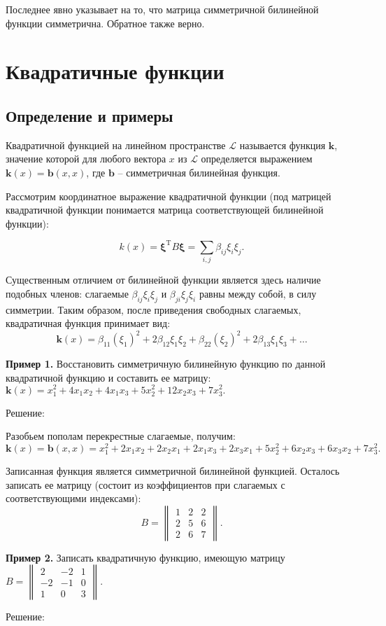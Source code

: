 Последнее явно указывает на то, что матрица симметричной билинейной функции симметрична. Обратное также верно.\\

\section{Квадратичные функции}
\subsection{Определение и примеры}
Квадратичной функцией на линейном пространстве $\mathcal{L}$ называется функция $\mathbf{k}$, значение которой для любого вектора $x$ из $\mathcal{L}$ определяется выражением $\mathbf{k}(x)=\mathbf{b}(x,x)$, где $\mathbf{b}$ -- симметричная билинейная функция.

Рассмотрим координатное выражение квадратичной функции (под матрицей квадратичной функции понимается матрица соответствующей билинейной функции):

$$k(x)=\bm{\xi}^{\text{T}}B\bm{\xi}=\sum_{i,j}\beta_{ij}\xi_i\xi_j.$$

Существенным отличием от билинейной функции является здесь наличие подобных членов: слагаемые $\beta_{ij}\xi_i\xi_j$ и $\beta_{ji}\xi_j\xi_i$ равны между собой, в силу симметрии. Таким образом, после приведения свободных слагаемых, квадратичная  функция принимает вид:$$\textbf{k}(x)=\beta_{11}(\xi_1)^2+2\beta_{12}\xi_1\xi_2+\beta_{22}(\xi_2)^2+2\beta_{13}\xi_1\xi_3+\ldots$$

\textbf{Пример 1.} Восстановить симметричную билинейную функцию по данной квадратичной функцию и составить ее матрицу: $\mathbf{k}(x)=x_1^2+4x_1x_2+4x_1x_3+5x_2^2+12x_2x_3+7x_3^2.$
\begin{center}
Решение:
\end{center}

Разобьем пополам перекрестные слагаемые, получим: $$\mathbf{k}(x)=\mathbf{b}(x,x)=x_1^2+2x_1x_2+2x_2x_1+2x_1x_3+2x_3x_1+
5x_2^2+6x_2x_3+6x_3x_2+7x_3^2.$$

Записанная функция является симметричной билинейной функцией. Осталось записать ее матрицу (состоит из коэффициентов при слагаемых с соответствующими индексами):
$$B=\begin{Vmatrix}
1 & 2 & 2 \\
2 & 5 & 6 \\
2 & 6 & 7
\end{Vmatrix}.$$

\textbf{Пример 2.} Записать квадратичную функцию, имеющую матрицу $B=\begin{Vmatrix}
2 & -2 & 1 \\
-2 & -1 & 0 \\
1 & 0 & 3
\end{Vmatrix}.$
\begin{center}
Решение:
\end{center}

